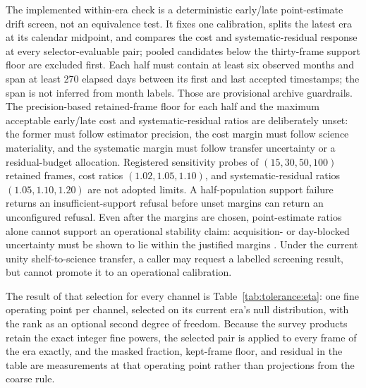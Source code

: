 The implemented within-era check is a deterministic early/late point-estimate drift screen, not an equivalence test. It fixes one calibration, splits the latest era at its calendar midpoint, and compares the cost and systematic-residual response at every selector-evaluable pair; pooled candidates below the thirty-frame support floor are excluded first. Each half must contain at least six observed months and span at least 270 elapsed days between its first and last accepted timestamps; the span is not inferred from month labels. Those are provisional archive guardrails. The precision-based retained-frame floor for each half and the maximum acceptable early/late cost and systematic-residual ratios are deliberately unset: the former must follow estimator precision, the cost margin must follow science materiality, and the systematic margin must follow transfer uncertainty or a residual-budget allocation. Registered sensitivity probes of $(15,30,50,100)$ retained frames, cost ratios $(1.02,1.05,1.10)$, and systematic-residual ratios $(1.05,1.10,1.20)$ are not adopted limits. A half-population support failure returns an insufficient-support refusal before unset margins can return an unconfigured refusal. Even after the margins are chosen, point-estimate ratios alone cannot support an operational stability claim: acquisition- or day-blocked uncertainty must be shown to lie within the justified margins \cite{kunsch1989,schuirmann1987}. Under the current unity shelf-to-science transfer, a caller may request a labelled screening result, but cannot promote it to an operational calibration.

The result of that selection for every channel is Table~\ref{tab:tolerance:eta}: one fine operating point per channel, selected on its current era's null distribution, with the rank as an optional second degree of freedom. Because the survey products retain the exact integer fine powers, the selected pair is applied to every frame of the era exactly, and the masked fraction, kept-frame floor, and residual in the table are measurements at that operating point rather than projections from the coarse rule.


